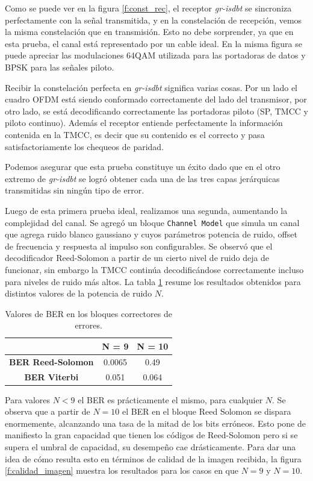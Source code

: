 Como se puede ver en la figura \ref{f:const_rec}, el receptor \textit{gr-isdbt} se sincroniza perfectamente con la señal transmitida, y en la constelación de recepción, vemos la misma constelación que en transmisión. Esto no debe sorprender, ya que en esta prueba, el canal está representado por un cable ideal. En la misma figura se puede apreciar las modulaciones 64QAM utilizada para las portadoras de datos y BPSK para las señales piloto. 

Recibir la constelación perfecta en \textit{gr-isdbt} significa varias cosas. Por un lado el cuadro OFDM está siendo conformado correctamente del lado del transmisor, por otro lado, se está decodificando correctamente las portadoras piloto (SP, TMCC y piloto continuo). Además el receptor entiende perfectamente la información contenida en la TMCC, es decir que su contenido es el correcto y pasa satisfactoriamente los chequeos de paridad.

Podemos asegurar que esta prueba constituye un éxito dado que en el otro extremo de \textit{gr-isdbt} se logró obtener cada una de las tres capas jerárquicas transmitidas sin ningún tipo de error.

Luego de esta primera prueba ideal, realizamos una segunda, aumentando la complejidad del canal. Se agregó un bloque \verb|Channel Model| que simula un canal que agrega ruido blanco gaussiano y cuyos parámetros potencia de ruido, offset de frecuencia y respuesta al impulso son configurables. Se observó que el decodificador Reed-Solomon a partir de un cierto nivel de ruido deja de funcionar, sin embargo la TMCC continúa decodificándose correctamente incluso para niveles de ruido más altos. La tabla \ref{t:resultados_errores} resume los resultados obtenidos para distintos valores de la potencia de ruido $N$.

\begin{table}[h!]
	\centering
	\begin{tabular}{|c|c|c|}
		\hline
			& \textbf{N = 9} & \textbf{N = 10}\\
		\hline
		\textbf{BER Reed-Solomon} & 0.0065 & 0.49\\
		\hline
		\textbf{BER Viterbi}		& 0.051 & 0.064\\
		\hline
	\end{tabular}
	\caption{\label{t:resultados_errores} Valores de BER en los bloques correctores de errores.}
\end{table} 

Para valores $N < 9$ el BER es prácticamente el mismo, para cualquier $N$. Se observa que a partir de $N = 10$ el BER en el bloque Reed Solomon se dispara enormemente, alcanzando una tasa de la mitad de los bits erróneos. Esto pone de manifiesto la gran capacidad que tienen los códigos de Reed-Solomon pero si se supera el umbral de capacidad, su desempeño cae drásticamente. Para dar una idea de cómo resulta esto en términos de calidad de la imagen recibida, la figura \ref{f:calidad_imagen} muestra los resultados para los casos en que $N = 9$ y $N = 10$.

